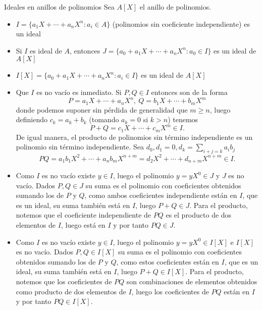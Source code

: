 \begin{example}{Ideales en anillos de polinomios}{}
    Sea \(A[X]\) el anillo de polinomios.
    \begin{itemize}
        \item \(I = \{a_1X + \cdots + a_nX^n : a_i \in A\}\) (polinomios sin coeficiente independiente) es un ideal
        \item Si \(I\) es ideal de \(A\), entonces \(J = \{a_0 + a_1X + \cdots + a_nX^n : a_0 \in I\}\) es un ideal de \(A[X]\)
        \item \(I[X] = \{a_0 + a_1X + \cdots + a_nX^n : a_i \in I\}\) es un ideal de \(A[X]\)
    \end{itemize}
\end{example}

\begin{proofbox}
    \begin{itemize}
        \item Que \(I\) es no vacío es inmediato. Si $P,Q \in I$ entonces son de la forma
        \[
        P = a_1X + \cdots + a_nX^n,\ Q = b_1X + \cdots + b_mX^m
        \]
        donde podemos suponer sin pérdida de generalidad que $m \geq n$, luego definiendo $c_k = a_k + b_k$ (tomando $a_k = 0$ si $k > n$) tenemos
        \[
        P + Q = c_1 X + \cdots + c_mX^m \in I.
        \]
        De igual manera, el producto de polinomios sin término independiente es un polinomio sin término independiente. Sea $d_0, d_1 = 0, d_k = \sum_{i + j = k} a_{i} b_{j}$
        \[
        PQ = a_1b_1 X^2 + \cdots + a_nb_m X^{n + m} = d_2 X^2 + \cdots + d_{n + m} X^{n + m} \in I.
        \]

        \item Como $I$ es no vacío existe $y \in I$, luego el polinomio $y = yX^0 \in J$ y $J$ es no vacío. Dados $P,Q \in J$ su suma es el polinomio con coeficientes obtenidos sumando los de $P$ y $Q$, como ambos coeficientes independiente están en $I$, que es un ideal, su suma también está en $I$, luego $P + Q \in J$. Para el producto, notemos que el coeficiente independiente de $PQ$ es el producto de dos elementos de $I$, luego está en $I$ y por tanto $PQ \in J$. 

        \item Como $I$ es no vacío existe $y \in I$, luego el polinomio $y = yX^0 \in I[X]$ e $I[X]$ es no vacío. Dados $P,Q \in I[X]$ su suma es el polinomio con coeficientes obtenidos sumando los de $P$ y $Q$, como estos coeficientes están en $I$, que es un ideal, su suma también está en $I$, luego $P + Q \in I[X]$. Para el producto, notemos que los coeficientes de $PQ$ son combinaciones de elementos obtenidos como producto de dos elementos de $I$, luego los coeficientes de $PQ$ están en $I$ y por tanto $PQ \in I[X]$.
    \end{itemize}
\end{proofbox}

